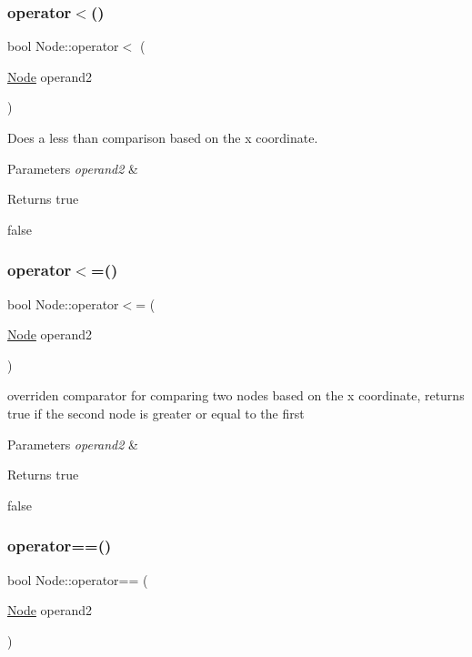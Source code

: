 \subsubsection{\texorpdfstring{operator$<$()}{operator<()}}
{\footnotesize\ttfamily bool Node\+::operator$<$ (\begin{DoxyParamCaption}\item[{\hyperlink{classNode}{Node}}]{operand2 }\end{DoxyParamCaption})}



Does a less than comparison based on the x coordinate. 


\begin{DoxyParams}{Parameters}
{\em operand2} & \\
\hline
\end{DoxyParams}
\begin{DoxyReturn}{Returns}
true 

false 
\end{DoxyReturn}
\mbox{\label{classNode_af2e6eb91242511cfdc0b3e971e236602}} 
\subsubsection{\texorpdfstring{operator$<$=()}{operator<=()}}
{\footnotesize\ttfamily bool Node\+::operator$<$= (\begin{DoxyParamCaption}\item[{\hyperlink{classNode}{Node}}]{operand2 }\end{DoxyParamCaption})}



overriden comparator for comparing two nodes based on the x coordinate, returns true if the second node is greater or equal to the first 


\begin{DoxyParams}{Parameters}
{\em operand2} & \\
\hline
\end{DoxyParams}
\begin{DoxyReturn}{Returns}
true 

false 
\end{DoxyReturn}
\mbox{\label{classNode_a7c1303e143bf8c170fbfa8e5fab9f88e}} 
\subsubsection{\texorpdfstring{operator==()}{operator==()}}
{\footnotesize\ttfamily bool Node\+::operator== (\begin{DoxyParamCaption}\item[{\hyperlink{classNode}{Node}}]{operand2 }\end{DoxyParamCaption})}



